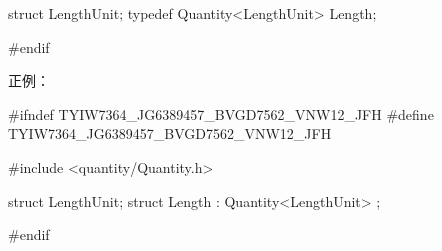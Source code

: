 \begin{content}
\begin{leftbar}
\begin{c++}[caption={\ttfamily{quantity/Length.h}}]
struct LengthUnit;
typedef Quantity<LengthUnit> Length;

#endif
\end{c++}
\end{leftbar}

正例：
\begin{leftbar}
\begin{c++}[caption={\ttfamily{quantity/Length.h}}]
#ifndef TYIW7364_JG6389457_BVGD7562_VNW12_JFH
#define TYIW7364_JG6389457_BVGD7562_VNW12_JFH

#include <quantity/Quantity.h>

struct LengthUnit;
struct Length : Quantity<LengthUnit> {};

#endif
\end{c++}
\end{leftbar}

\end{content}

